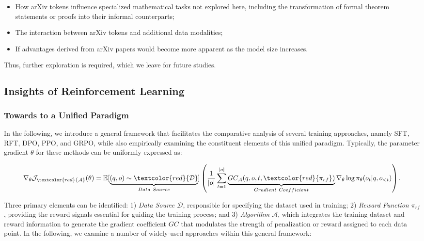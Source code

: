 \begin{itemize}[topsep=0pt]
\begin{itemize}[topsep=0pt]
\begin{itemize}[topsep=0pt]
    \item How arXiv tokens influence specialized mathematical tasks not explored here, including the transformation of formal theorem statements or proofs into their informal counterparts;
    \item The interaction between arXiv tokens and additional data modalities;
    \item If advantages derived from arXiv papers would become more apparent as the model size increases.
\end{itemize}

Thus, further exploration is required, which we leave for future studies.

\subsection{Insights of Reinforcement Learning}
\subsubsection{Towards to a Unified Paradigm} In the following, we introduce a general framework that facilitates the comparative analysis of several training approaches, namely SFT, RFT, DPO, PPO, and GRPO, while also empirically examining the constituent elements of this unified paradigm. Typically, the parameter gradient $\theta$ for these methods can be uniformly expressed as:

\begin{equation}
    \nabla_{\theta}\mathcal{J}_{\textcolor{red}{\mathcal{A}}}(\theta) = \mathbb{E}[\underbrace{(q,o) \sim \textcolor{red}{\mathcal{D}}}_{Data \ Source}]\left( \frac{1}{|o|} \sum_{t=1}^{|o|}  \underbrace{GC_{{\mathcal{A}}}(q, o, t, \textcolor{red}{\pi_{{rf}}})}_{Gradient \ Coefficient}  \nabla_{\theta}\log \pi_{\theta}(o_t | q, o_{<t})\right).
\label{eq:objective}
\end{equation}

Three primary elements can be identified: 1) \textit{Data Source $\mathcal{D}$}, responsible for specifying the dataset used in training; 2) \textit{Reward Function $\pi_{{rf}}$}, providing the reward signals essential for guiding the training process; and 3) \textit{Algorithm $\mathcal{A}$}, which integrates the training dataset and reward information to generate the gradient coefficient $GC$ that modulates the strength of penalization or reward assigned to each data point. In the following, we examine a number of widely-used approaches within this general framework:


\end{itemize}
\end{itemize}
